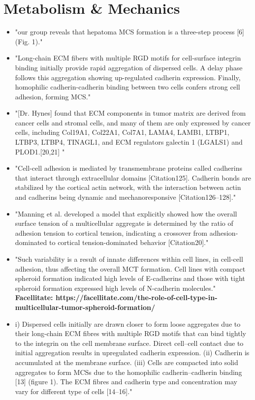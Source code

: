 \documentclass[11pt,a4paper]{article}
\begin{document}
\section{Metabolism \& Mechanics}
\begin{itemize}
\item  "our group reveals that hepatoma MCS formation is a three-step process [6] (Fig. 1)."\cite{Lin2008}
\item "Long-chain ECM fibers with multiple RGD motifs for cell-surface integrin binding initially provide rapid aggregation of dispersed cells. A delay phase follows this aggregation
showing up-regulated cadherin expression. Finally, homophilic cadherin-cadherin binding between two cells confers strong cell adhesion, forming MCS."\cite{Lin2008}
\item "[Dr. Hynes] found that ECM components in tumor matrix
are derived from cancer cells and stromal cells,
and many of them are only expressed by cancer
cells, including Col19A1, Col22A1, Col7A1, LAMA4,
LAMB1, LTBP1, LTBP3, LTBP4, TINAGL1, and ECM
regulators galectin 1 (LGALS1) and PLOD1.[20,21] "\cite{Xiong2016}
\item "Cell-cell adhesion is mediated by transmembrane proteins called cadherins that interact through extracellular domains [Citation125]. Cadherin bonds are stabilized by the cortical actin network, with the interaction between actin and cadherins being dynamic and mechanoresponsive [Citation126–128]."\cite{Boot2021}

\item "Manning et al. developed a model that explicitly showed how the overall surface tension of a multicellular aggregate is determined by the ratio of adhesion tension to cortical tension, indicating a crossover from adhesion-dominated to cortical tension-dominated behavior [Citation20]."\cite{Boot2021}

\item "Such variability is a result of innate differences within cell lines, in cell-cell adhesion, thus affecting the overall MCT formation. Cell lines with compact spheroid formation indicated high levels of E-cadherins and those with tight spheroid formation expressed high levels of N-cadherin molecules." \textbf{Facellitate: https://facellitate.com/the-role-of-cell-type-in-multicellular-tumor-spheroid-formation/}

\item i) Dispersed cells initially are drawn closer to form loose aggregates due to their long-chain ECM fibres with multiple RGD motifs that can bind tightly to the integrin on the cell membrane surface. Direct cell–cell contact due to initial aggregation results in upregulated cadherin expression. (ii) Cadherin is accumulated at the membrane surface. (iii) Cells are compacted into solid aggregates to form MCSs due to the homophilic cadherin–cadherin binding [13] (figure 1). The ECM fibres and cadherin type and concentration may vary for different type of cells [14–16]."\cite{Cui2017}


\end{itemize}
\end{document}
